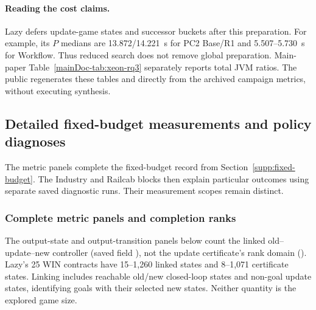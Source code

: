 \documentclass[11pt]{article}
\begin{document}
\paragraph{Reading the cost claims.}
Lazy defers update-game states and successor buckets after this preparation. For example, its $P$ medians are 13.872/14.221~s for PC2 Base/R1 and 5.507--5.730~s for Workflow. Thus reduced search does not remove global preparation. Main-paper Table~\ref{mainDoc-tab:xeon-rq3} separately reports total JVM ratios. The public  regenerates these tables and  directly from the archived campaign metrics, without executing synthesis.

\clearpage
\subsection{Detailed fixed-budget measurements and policy diagnoses}
\label{supp:detailed-diagnostics}
The metric panels complete the fixed-budget record from Section~\ref{supp:fixed-budget}. The Industry and Railcab blocks then explain particular outcomes using separate saved diagnostic runs. Their measurement scopes remain distinct.

\subsubsection{Complete metric panels and completion ranks}
\label{supp:metric-panels}
\begingroup
\newcount\FGMetricPanel
{}
\let\FGClearPage\clearpage
\def\clearpage{%
  \advance\FGMetricPanel by 1
  \ifnum\FGMetricPanel=1\relax
  \else\ifnum\FGMetricPanel=3\par\bigskip
  \else\ifnum\FGMetricPanel=7\par\bigskip
  \else\FGClearPage
  \fi\fi\fi}
The output-state and output-transition panels below count the linked old--update--new controller (saved field ), not the update certificate's rank domain (). Lazy's 25 WIN contracts have 15--1,260 linked states and 8--1,071 certificate states. Linking includes reachable old/new closed-loop states and non-goal update states, identifying goals with their selected new states. Neither quantity is the explored game size.

\endgroup

\end{document}
